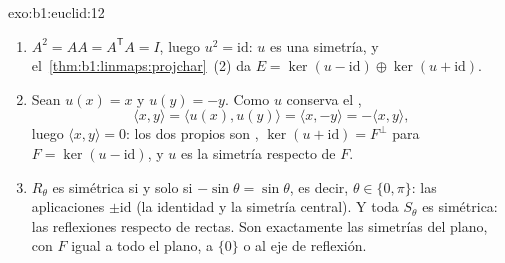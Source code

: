 \begin{solution}{exo:b1:euclid:12}
\begin{enumerate}
  \item $A^2 = A A = A^{\mathsf T} A = I$, luego
        $u^2 = \mathrm{id}$: $u$ es una simetría, y
        el~\cref{thm:b1:linmaps:projchar}~(2) da
        $E = \ker(u - \mathrm{id}) \oplus \ker(u + \mathrm{id})$.
  \item Sean $u(x) = x$ y $u(y) = -y$. Como $u$ conserva el
        ,
        \[
        \langle x, y\rangle = \langle u(x), u(y)\rangle
        = \langle x, -y\rangle = -\langle x, y\rangle ,
        \]
        luego $\langle x, y\rangle = 0$: los dos  propios
        son , $\ker(u + \mathrm{id}) = F^\perp$ para
        $F = \ker(u - \mathrm{id})$, y $u$ es la simetría
         respecto de $F$.
  \item $R_\theta$ es simétrica si y solo si
        $-\sin\theta = \sin\theta$, es decir,
        $\theta \in \{0, \pi\}$: las aplicaciones $\pm\mathrm{id}$
        (la identidad y la simetría central). Y toda $S_\theta$ es
        simétrica: las reflexiones respecto de rectas. Son
        exactamente las simetrías  del plano, con $F$
        igual a todo el plano, a $\{0\}$ o al eje de reflexión.
\end{enumerate}
\end{solution}

